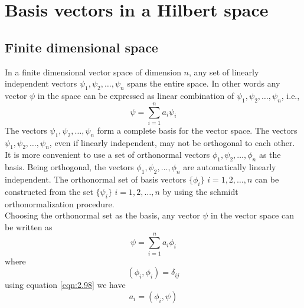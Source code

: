 \section{Basis vectors in a Hilbert space}
\subsection{Finite dimensional space}
In a finite dimensional vector space of dimension $n$, any set of linearly independent vectors $\psi_1, \psi_2, \ldots, \psi_n$ spans the entire space. In other words any vector $\psi$ in the space can be expressed as linear combination of $\psi_1, \psi_2, \ldots, \psi_n$, i.e.,
\begin{equation}\label{eqn:2.96}
\psi = \sum_{i=1}^{n} a_i \psi_i
\end{equation}
The vectors $\psi_1, \psi_2, \ldots, \psi_n$ form a complete basis for the vector space. The vectors $\psi_1, \psi_2, \ldots, \psi_n$, even if linearly independent, may not be orthogonal to each other. It is more convenient to use a set of orthonormal vectors $\phi_1, \psi_2, \ldots, \phi_n$ as the basis. Being orthogonal, the vectors $\phi_1, \psi_2, \ldots, \phi_n$ are automatically linearly independent. The orthonormal set of basis vectors $\{\phi_i \}$ $i = 1,2,\ldots,n$ can be constructed from the set $\{\psi_i \}$ $i = 1,2,\ldots,n$ by using the schmidt orthonormalization procedure.\\
Choosing the orthonormal set as the basis, any vector $\psi$ in the vector space can be written as
\begin{equation}\label{eqn:2.97}
\psi = \sum_{i=1}^{n} a_i \phi_i
\end{equation}
where
\begin{equation}\label{eqn:2.98}
(\phi_i, \phi_i) = \delta_{ij}
\end{equation}
using equation \ref{eqn:2.98} we have
\begin{equation}\label{eqn:2.99}
a_i = (\phi_i, \psi)
\end{equation}
